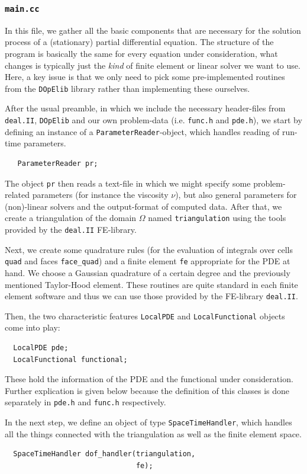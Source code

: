 \documentclass[smallextended]{svjour3}       %
\numberwithin{equation}{section}
\newcommand{\deal}{\texttt{deal.II}}
\newcommand{\dope}{\texttt{DOpElib}}
\begin{document}
\subsubsection{\texttt{main.cc}}
In this file, we gather all the basic components that are necessary for the
solution process of a (stationary) partial differential equation. The
structure of the program is basically the same for every equation under
consideration, what changes is typically just the \textit{kind} of  finite
element or linear solver we want to use. Here, a key issue is that we only need to pick 
some pre-implemented routines from the \dope{} library rather than 
implementing these ourselves.


After the usual preamble, in which we include the necessary header-files 
from \deal{}, \dope{} and our own problem-data (i.e. \texttt{func.h} 
and \texttt{pde.h}), we start by defining an instance of a 
\texttt{ParameterReader}-object, which handles reading of run-time parameters.
\begin{lstlisting}
   ParameterReader pr;
\end{lstlisting}
The object \texttt{pr} then reads a text-file in which we might specify some 
problem-related parameters (for instance the viscosity $\nu$), but also general
 parameters for (non)-linear solvers and the output-format of computed data. 
After that, we create a triangulation of the domain $\Omega$ named 
\texttt{triangulation} using the tools provided by the \deal{} FE-library.

Next, we create some quadrature rules (for the evaluation of integrals over
cells \texttt{quad} and faces \texttt{face\_quad}) and a finite element \texttt{fe}
appropriate for the PDE at hand. We
choose a Gaussian quadrature of a certain degree and the previously mentioned
Taylor-Hood element. These routines are quite standard in each finite element
software and thus we can use those provided by the FE-library \deal{}.

Then, the two characteristic features \texttt{LocalPDE} and \texttt{LocalFunctional} objects come into play:
\begin{lstlisting}
  LocalPDE pde;
  LocalFunctional functional;
\end{lstlisting}
These hold the information of the PDE and the functional under consideration. Further explication is given below because
the definition of this classes is done separately in \texttt{pde.h} 
and \texttt{func.h} respectively.

In the next step, we define an object of type \texttt{SpaceTimeHandler}, which handles all the things connected with the triangulation as well as the finite element space. 
\begin{lstlisting}
  SpaceTimeHandler dof_handler(triangulation,
                               fe);
\end{lstlisting}
\end{document}
